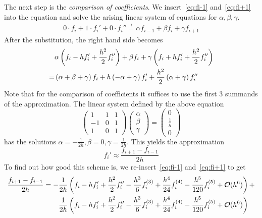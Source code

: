 The next step is the \textit{comparison of coefficients}. We insert~\eqref{eq:fi-1} and~\eqref{eq:fi+1}
into the equation and solve the arising linear system of equations for $\alpha,\beta,\gamma$.
\begin{align}
    0\cdot f_i + 1\cdot f_i' + 0\cdot f_i'' \overset{!}{=} \alpha f_{i-1} + \beta f_i + \gamma
    f_{i+1}
\end{align}
After the substitution, the right hand side becomes
\begin{align}
    &\alpha \left(f_i - hf_i' + \frac{h^2}{2}f_i''\right) + \beta f_i + \gamma\left(f_i + hf_i' + \frac{h^2}{2}f_i''\right)\notag\\
    = &\left(\alpha+\beta+\gamma\right)f_i + h\left(-\alpha+\gamma\right)f_i' + \frac{h^2}{2}\left(\alpha+\gamma\right)f_i''
\end{align} 
Note that for the comparison of coefficients it suffices to use the first 3 summands of the
approximation. The linear system defined by the above equation
\begin{equation}
    \begin{pmatrix}
        1&1&1\\
        -1&0&1\\
        1&0&1
    \end{pmatrix}
    \begin{pmatrix}
        \alpha\\
        \beta\\
        \gamma
    \end{pmatrix}
    =
    \begin{pmatrix}
        0\\
        \frac{1}{h}\\
        0
    \end{pmatrix}
\end{equation}
has the solutions $\alpha = -\frac{1}{2h}, \beta = 0, \gamma = \frac{1}{2h}$.
This yields the approximation 
\begin{equation}
    f_i'\approx\frac{f_{i+1} - f_{i-1}}{2h}
\end{equation}
To find out how good this scheme is, we re-insert~\eqref{eq:fi-1} and~\eqref{eq:fi+1} to get
\begin{align}
    \frac{f_{i+1} - f_{i-1}}{2h}= -&\frac{1}{2h}\left(f_i - hf_i' + \frac{h^2}{2}f_i'' -
        \frac{h^3}{6}f_i^{(3)} + \frac{h^4}{24}f_i^{(4)} -
    \frac{h^5}{120}f_i^{(5)} + \mathcal{O}(h^6)\right) + \notag\\
                                   &\frac{1}{2h}\left(f_i - hf_i' + \frac{h^2}{2}f_i'' -
                                       \frac{h^3}{6}f_i^{(3)} + \frac{h^4}{24}f_i^{(4)} -
                                   \frac{h^5}{120}f_i^{(5)} + \mathcal{O}(h^6)\right)\notag
\end{align}
